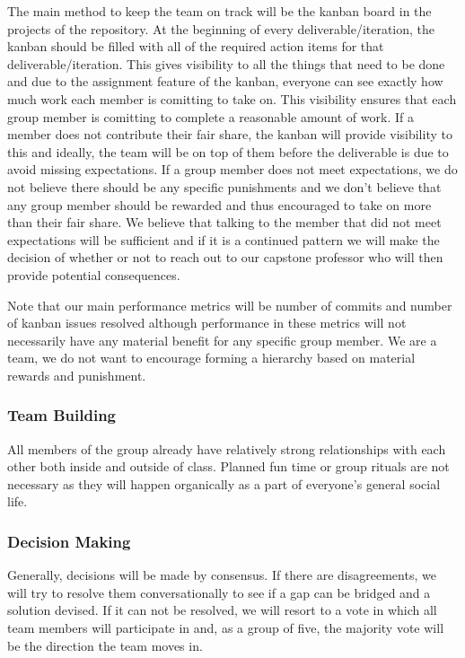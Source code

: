 \documentclass{article}
\begin{document}
\par{ The main method to keep the team on track will be the kanban board in the projects of the repository. At the beginning of every
deliverable/iteration, the kanban should be filled with all of the required action items for that deliverable/iteration. This gives visibility 
to all the things that need to be done and due to the assignment feature of the kanban, everyone can see exactly how much work each member
is comitting to take on. This visibility ensures that each group member is comitting to complete a reasonable amount of work.\newline\newline
If a member does not contribute their fair share, the kanban will provide visibility to this and ideally, the team will be on top of them
before the deliverable is due to avoid missing expectations. If a group member does not meet expectations, we do not believe there should be
any specific punishments and we don't believe that any group member should be rewarded and thus encouraged to take on more than their fair share. We believe
that talking to the member that did not meet expectations will be sufficient and if it is a continued pattern we will make the decision of whether or not to
reach out to our capstone professor who will then provide potential consequences.\newline\newline

Note that our main performance metrics will be number of commits and number of kanban issues resolved although performance in these metrics
will not necessarily have any material benefit for any specific group member. We are a team, we do not want to encourage forming a hierarchy 
based on material rewards and punishment.}

\subsubsection*{Team Building}


\par{ All members of the group already have relatively strong relationships with each other both inside and outside of class. Planned fun time or group rituals are
not necessary as they will happen organically as a part of everyone's general social life.}

\subsubsection*{Decision Making} 


\par{ Generally, decisions will be made by consensus. If there are
disagreements, we will try to resolve them conversationally to see if a gap can be bridged and a solution devised. If it can not be resolved, we will
resort to a vote in which all team members will participate in and, as a group of five, the majority vote will be the direction the team moves in. }
\end{document}
